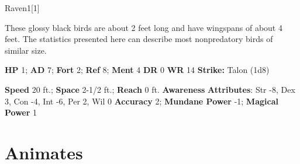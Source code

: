   
  \begin{monsection}{Raven}{1}[1]
    \vspace{-1em}\vspace{-1em}
    \vspace{0em}

    
      These glossy black birds are about 2 feet long and have wingspans of about 4 feet.
      The statistics presented here can describe most nonpredatory birds of similar size.
    

    \begin{spellcontent}
      \begin{spelltargetinginfo}
        \pari \textbf{HP} 1;
          \textbf{AD} 7;
          \textbf{Fort} 2;
          \textbf{Ref} 8;
          \textbf{Ment} 4
        \pari \textbf{DR} 0
        \pari \textbf{WR} 14
        \pari \textbf{Strike:}
            Talon  (1d8)
      \end{spelltargetinginfo}
    \end{spellcontent}
    \begin{monsterfooter}
      \pari \textbf{Speed} 20 ft.;
        \textbf{Space} 2-1/2 ft.;
        \textbf{Reach} 0 ft.
      \pari \textbf{Awareness} 
      \pari \textbf{Attributes}:
        Str -8, Dex 3,
        Con -4, Int -6,
        Per 2, Wil 0
      \pari \textbf{Accuracy} 2;
        \textbf{Mundane Power} -1;
      \textbf{Magical Power} 1
    \end{monsterfooter}
  \end{monsection}
  
  
        \section{Animates}
      
